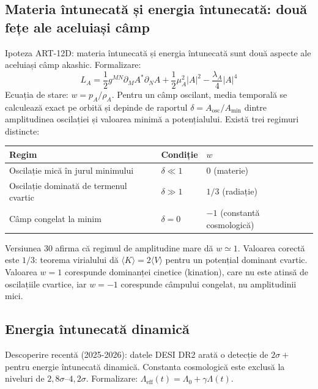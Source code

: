 \documentclass[11pt,a4paper]{article}
\begin{document}
\subsection{Materia întunecată și energia întunecată: două fețe ale aceluiași câmp}
Ipoteza ART-12D: materia întunecată și energia întunecată sunt două aspecte ale aceluiași câmp akashic. Formalizare: 
\begin{equation}
L_A = \frac{1}{2} g^{MN} \partial_M A^* \partial_N A + \frac{1}{2} \mu_A^2 |A|^2 - \frac{\lambda_A}{4} |A|^4
\end{equation}
Ecuația de stare: $w = p_A / \rho_A$. Pentru un câmp oscilant, media temporală se calculează exact pe orbită și depinde de raportul $\delta = A_{\text{osc}}/A_{\min}$ dintre amplitudinea oscilației și valoarea minimă a potențialului. Există trei regimuri distincte:
\begin{center}
\begin{tabular}{@{}lll@{}}
\toprule
\textbf{Regim} & \textbf{Condiție} & $w$ \\ \midrule
Oscilație mică în jurul minimului & $\delta \ll 1$ & $0$ (materie) \\
Oscilație dominată de termenul cvartic & $\delta \gg 1$ & $1/3$ (radiație) \\
Câmp congelat la minim & $\delta = 0$ & $-1$ (constantă cosmologică) \\ \bottomrule
\end{tabular}
\end{center}
Versiunea 30 afirma că regimul de amplitudine mare dă $w \simeq 1$. Valoarea corectă este $1/3$: teorema virialului dă $\langle K \rangle = 2\langle V \rangle$ pentru un potențial dominant cvartic. Valoarea $w = 1$ corespunde dominanței cinetice (kination), care nu este atinsă de oscilațiile cvartice, iar $w = -1$ corespunde câmpului congelat, nu amplitudinii mici.

\subsection{Energia întunecată dinamică}
Descoperire recentă (2025-2026): datele DESI DR2 arată o detecție de $2\sigma+$ pentru energie întunecată dinamică. Constanta cosmologică este exclusă la niveluri de $2,8\sigma$–$4,2\sigma$. Formalizare: $\Lambda_{\text{eff}}(t) = \Lambda_0 + \gamma \Lambda(t)$.
\end{document}
